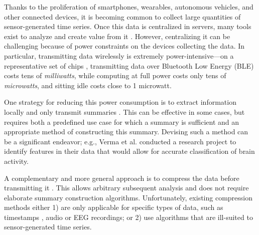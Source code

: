 





Thanks to the proliferation of smartphones, wearables, autonomous vehicles, and other connected devices, it is becoming common to collect large quantities of sensor-generated time series. Once this data is centralized in servers, many tools exist to analyze and create value from it \cite{spark, mapreduce, hive, hdfs, influxDB, druid, littleTable, openTSDB}. However, centralizing it can be challenging because of power constraints on the devices collecting the data. In particular, transmitting data wirelessly is extremely power-intensive---on a representative set of chips \cite{cc2540, cc2640}, transmitting data over Bluetooth Low Energy (BLE) costs tens of \textit{milliwatts}, while computing at full power costs only tens of \textit{microwatts}, and sitting idle costs close to 1 microwatt.

One strategy for reducing this power consumption is to extract information locally and only transmit summaries \cite{guttagAnanthaEEG, socialFMRI, respawnDB}. This can be effective in some cases, but requires both a predefined use case for which a summary is sufficient and an appropriate method of constructing this summary. Devising such a method can be a significant endeavor; e.g., Verma et al. \cite{guttagAnanthaEEG} conducted a research project to identify features in their data that would allow for accurate classification of brain activity.

A complementary and more general approach is to compress the data before transmitting it \cite{socialFMRI, lachCompress, sensorTransforms, iotSignals, iotCompressCrap}. This allows arbitrary subsequent analysis and does not require elaborate summary construction algorithms. Unfortunately, existing compression methods either 1) are only applicable for specific types of data, such as timestamps \cite{gorilla, berkeleyTreeDB, fastpfor}, audio \cite{flac, shorten, aac, vorbis} or EEG \cite{guttagAnanthaEEG, eegCS} recordings; or 2) use algorithms that are ill-suited to sensor-generated time series.

